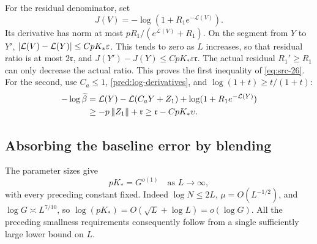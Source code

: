 For the residual denominator, set
\[
 J(V)=-\log(1+R_1e^{-\mathcal L(V)}).
\]
Its derivative has norm at most
\(pR_1/(e^{\mathcal L(V)}+R_1)\).
On the segment from \(Y\) to \(Y'\),
\(\left|\mathcal L(V)-\mathcal L(Y)\right|\le CpK_*\varepsilon\).
This tends to zero as \(L\) increases, so that residual ratio is at
most \(2\mathfrak r\), and
\(J(Y')-J(Y)\le CpK_*\varepsilon\mathfrak r\).
The actual residual \(R_1'\ge R_1\) can only decrease the actual
ratio. This proves the first inequality of \eqref{eq:src-26}.
For the second, use \(C_a\le1\), \eqref{pred:log-derivatives},
and \(\log(1+t)\ge t/(1+t)\):
\begin{align*}
 -\log\widetilde\beta
 &=\mathcal L(Y)-\mathcal L(C_aY+Z_1)
       +\log(1+R_1e^{-\mathcal L(Y)})\\
 &\ge-p\left\|Z_1\right\|+\mathfrak r
 \ge\mathfrak r-CpK_*\upsilon.
\end{align*}

\subsection{Absorbing the baseline error by blending}

The parameter sizes give
\begin{equation}
 pK_* = G^{o(1)}\quad\text{as }L\longrightarrow\infty,
 \label{pred:subpower-amplitude}
\end{equation}
with every preceding constant fixed.
Indeed \(\log N\le2L\), \(\mu=O(L^{-1/2})\), and
\(\log G\asymp L^{7/10}\), so
\(\log(pK_*)=O(\sqrt L+\log L)=o(\log G)\).
All the preceding smallness requirements consequently follow from a
single sufficiently large lower bound on \(L\).

